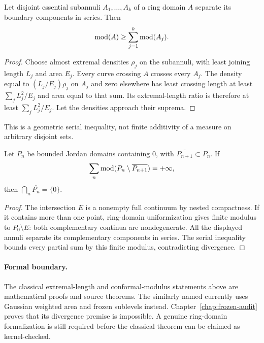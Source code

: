\begin{theorem}
Let disjoint essential subannuli $A_1,\ldots,A_k$ of a ring domain $A$
separate its boundary components in series.  Then
\[
 \operatorname{mod}(A)\ge\sum_{j=1}^k\operatorname{mod}(A_j).
\]
\end{theorem}

\begin{proof}
Choose almost extremal densities $\rho_j$ on the subannuli, with
least joining length $L_j$ and area $E_j$.  Every curve crossing $A$
crosses every $A_j$.  The density equal to
$(L_j/E_j)\rho_j$ on $A_j$ and zero elsewhere has least crossing
length at least $\sum_j L_j^2/E_j$ and area equal to that sum.
Its extremal-length ratio is therefore at least
$\sum_j L_j^2/E_j$.  Let the densities approach their suprema.
\end{proof}

This is a geometric serial inequality, not finite additivity of a
measure on arbitrary disjoint sets.

\begin{theorem}
\label{thm:yoccoz-shrink}
Let $P_n$ be bounded Jordan domains containing $0$, with
$\overline{P_{n+1}}\subset P_n$.  If
\[
 \sum_n\operatorname{mod}(P_n\setminus\overline{P_{n+1}})=+\infty,
\]
then $\bigcap_n\overline{P_n}=\{0\}$.
\end{theorem}

\begin{proof}
The intersection $E$ is a nonempty full continuum by nested
compactness.  If it contains more than one point, ring-domain
uniformization gives finite modulus to $P_0\setminus E$: both
complementary continua are nondegenerate.
All the displayed annuli separate its complementary components in
series.  The serial inequality bounds every partial sum by this
finite modulus, contradicting divergence.
\end{proof}

\paragraph{Formal boundary.}
The classical extremal-length and conformal-modulus statements above
are mathematical proofs and source theorems.  The similarly named
 currently uses Gaussian
weighted area and frozen sublevels instead.
Chapter~\ref{chap:frozen-audit} proves that its divergence premise is
impossible.  A genuine ring-domain formalization is still required
before the classical theorem can be claimed as kernel-checked.
